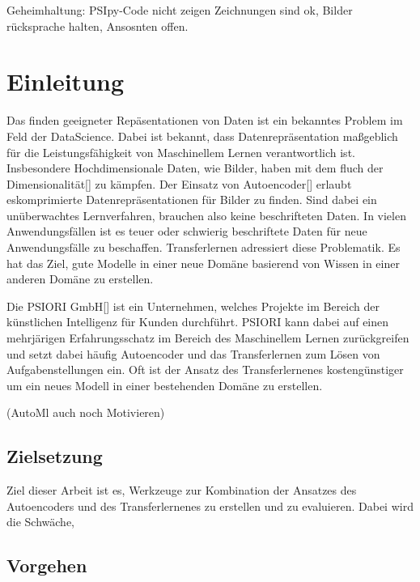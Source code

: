 \listoftodos

Geheimhaltung: PSIpy-Code nicht zeigen Zeichnungen sind ok, Bilder rücksprache halten, Ansosnten offen.
 
 

 
\chapter{Einleitung}
\label{chap:Einleitung}
	Das finden geeigneter Repäsentationen von Daten ist ein bekanntes Problem im Feld der DataScience. Dabei ist bekannt, dass Datenrepräsentation maßgeblich für die Leistungsfähigkeit von Maschinellem Lernen verantwortlich ist. Insbesondere Hochdimensionale Daten, wie Bilder, haben mit dem fluch der Dimensionalität[] zu kämpfen. Der Einsatz von Autoencoder[] erlaubt eskomprimierte Datenrepräsentationen für Bilder zu finden. Sind dabei ein unüberwachtes Lernverfahren, brauchen also keine beschrifteten Daten.
	In vielen Anwendungsfällen ist es teuer oder schwierig beschriftete Daten für neue Anwendungsfälle zu beschaffen. Transferlernen adressiert diese Problematik. Es hat das Ziel, gute Modelle in einer neue Domäne basierend von Wissen in einer anderen Domäne zu erstellen.
	
	Die PSIORI GmbH[] ist ein Unternehmen, welches Projekte im Bereich der künstlichen Intelligenz für Kunden durchführt. PSIORI kann dabei auf einen mehrjärigen Erfahrungsschatz im Bereich des Maschinellem Lernen zurückgreifen und setzt dabei häufig Autoencoder und das Transferlernen zum Lösen von Aufgabenstellungen ein. Oft ist der Ansatz des Transferlernenes kostengünstiger um ein neues Modell in einer bestehenden Domäne zu erstellen. 

 	(AutoMl auch noch Motivieren)

	\section{Zielsetzung}
	\label{sec:Zielsetzung}
	Ziel dieser Arbeit ist es, Werkzeuge zur Kombination der Ansatzes des Autoencoders und des Transferlernenes zu erstellen und zu evaluieren. Dabei wird die Schwäche,   

	\section{Vorgehen}
	\label{sec:Vorgehen}
	
	




